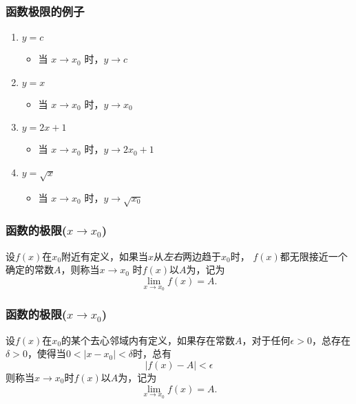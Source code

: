 \documentclass[14pt,notheorems,leqno,xcolor={rgb}]{beamer} %
\begin{document}
\begin{iframe}
\frametitle{函数极限的例子}
\begin{enumerate}[<+->]
  \item $y=c$
  \begin{itemize}
    \item 当 $x\to x_0$ 时，$y\to c$
  \end{itemize}
  \item $y=x$
  \begin{itemize}
    \item 当 $x\to x_0$ 时，$y\to x_0$
  \end{itemize}
  \item $y=2x+1$
  \begin{itemize}
    \item 当 $x\to x_0$ 时，$y\to 2x_0+1$
  \end{itemize}
  \item $y=\sqrt{x}$
  \begin{itemize}
    \item 当 $x\to x_0$ 时，$y\to\sqrt{x_0}$
  \end{itemize}
\end{enumerate}
\end{iframe}

\begin{oframe}
\frametitle{函数的极限($x\to x_0$)}
\begin{definition*}
设$f(x)$在$x_0$附近有定义，如果当$x$从\emph{左右}两边趋于$x_0$时，
$f(x)$都无限接近一个确定的常数$A$，则称当$x\to x_0$ 时$f(x)$以$A$为，记为
\[ \lim_{x\to x_0}f(x)=A. \]
\end{definition*}
\end{oframe}

\begin{iframe}
\frametitle{函数的极限($x\to x_0$)}
\begin{definition}
设$f(x)$在$x_0$的某个去心邻域内有定义，如果存在常数$A$，对于任何$\epsilon>0$，总存在$\delta>0$，使得当$0<|x-x_0|<\delta$时，总有
\[ |f(x)-A|<\epsilon \]
则称当$x\to x_0$时$f(x)$以$A$为，记为
\[ \lim_{x\to x_0}f(x)=A. \]
\end{definition}
\end{iframe}
\end{document}
